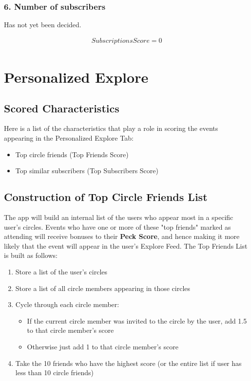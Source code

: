 \documentclass[12pt]{amsart}
\begin{document}
\medskip

\subsubsection*{6. Number of subscribers}

Has not yet been decided.

	\begin{align*}
		Subscriptions Score = 0\\
	\end{align*}
		
\section*{Personalized Explore}

\subsection*{Scored Characteristics}

Here is a list of the characteristics that play a role in scoring the events appearing in the Personalized Explore Tab: \newline

\begin{itemize}
	\item Top circle friends (Top Friends Score)
  	\item Top similar subscribers (Top Subscribers Score)
\end{itemize}

\medskip

\subsection*{Construction of Top Circle Friends List}

The app will build an internal list of the users who appear most in a specific user's circles. Events who have one or more of these "top friends" marked as attending will receive bonuses to their \textbf{Peck Score}, and hence making it more likely that the event will appear in the user's Explore Feed. The Top Friends List is built as follows:

\begin{enumerate}
	\item Store a list of the user's circles
	\item Store a list of all circle members appearing in those circles
	\item Cycle through each circle member:
		\begin{itemize}
			\item If the current circle member was invited to the circle by the user, add 1.5 to that circle member's score
			\item Otherwise just add 1 to that circle member's score
		\end{itemize}
	\item Take the 10 friends who have the highest score (or the entire list if user has less than 10 circle friends)
\end{enumerate}
\end{document}
